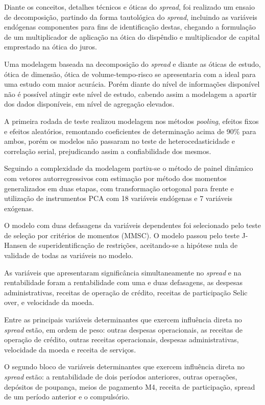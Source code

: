 \documentclass[
  12pt,
  12pt,
  openright,
  oneside,
  a4paper,
  chapter=TITLE,
  section=TITLE,
  subsection=TITLE,
  subsubsection=TITLE,
  english,
  portugues,
  sumario=tradicional]{abntex2}
\begin{document}
Diante os conceitos, detalhes técnicos e óticas do \emph{spread}, foi realizado um ensaio de decomposição, partindo da forma tautológica do \emph{spread}, incluindo as variáveis endógenas componentes para fins de identificação destas, chegando a formulação de um multiplicador de aplicação na ótica do dispêndio e multiplicador de capital emprestado na ótica do juros.

Uma modelagem baseada na decomposição do \emph{spread} e diante as óticas de estudo, ótica de dimensão, ótica de volume-tempo-risco se apresentaria com a ideal para uma estudo com maior acurácia. Porém diante do nível de informações disponível não é possível atingir este nível de estudo, cabendo assim a modelagem a apartir dos dados disponíveis, em nível de agregação elevados.

A primeira rodada de teste realizou modelagem nos métodos \emph{pooling}, efeitos fixos e efeitos aleatórios, remontando coeficientes de determinação acima de 90\% para ambos, porém os modelos não passaram no teste de heterocedasticidade e correlação serial, prejudicando assim a confiabilidade dos mesmos.

Seguindo a complexidade da modelagem partiu-se o método de painel dinâmico com vetores autorregressivos com estimação por método dos momentos generalizados em duas etapas, com transformação ortogonal para frente e utilização de instrumentos PCA com 18 variáveis endógenas e 7 variáveis exógenas.

O modelo com duas defasagens da variáveis dependentes foi selecionado pelo teste de seleção por critérios de momentos (MMSC). O modelo passou pelo teste J-Hansen de superidentificação de restrições, aceitando-se a hipótese nula de validade de todas as variáveis no modelo.

As variáveis que apresentaram significância simultaneamente no \emph{spread} e na rentabilidade foram a rentabilidade com uma e duas defasagens, as despesas administrativas, receitas de operação de crédito, receitas de participação Selic over, e velocidade da moeda.

Entre as principais variáveis determinantes que exercem influência direta no \emph{spread} estão, em ordem de peso: outras despesas operacionais, as receitas de operação de crédito, outras receitas operacionais, despesas administrativas, velocidade da moeda e receita de serviços.

O segundo bloco de variáveis determinantes que exercem influência direta no \emph{spread} estão: a rentabilidade de dois períodos anteriores, outras operações, depósitos de poupança, meios de pagamento M4, receita de participação, spread de um período anterior e o compulsório.
\end{document}
